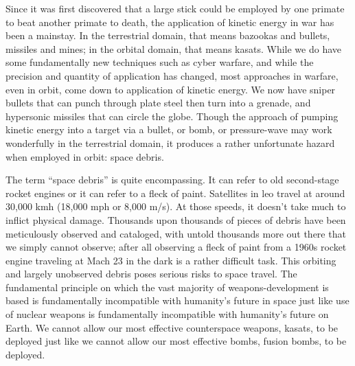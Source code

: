 {}

\titlenote{}

\maketitle

\pagestyle{theRest}
\thispagestyle{firstPage}

Since it was first discovered that a large stick could be employed by
one primate to beat another primate to death, the application of
kinetic energy in war has been a mainstay.  In the terrestrial domain,
that means bazookas and bullets, missiles and mines; in the orbital
domain, that means \acp{kasat}.  While we do have some fundamentally
new techniques such as cyber warfare\cite{big-risks}, and while the
precision and quantity of application has changed, most approaches in
warfare, even in orbit, come down to application of kinetic
energy.\cite{brian} We now have sniper bullets that can punch through
plate steel then turn into a grenade\cite{fancy-bullets}, and
hypersonic missiles that can circle the globe.\cite{china-is-hyper}
Though the approach of pumping kinetic energy into a target via a
bullet, or bomb, or pressure-wave may work wonderfully in the
terrestrial domain, it produces a rather unfortunate hazard when
employed in orbit: space debris.

The term ``space debris'' is quite encompassing.  It can refer to old
second-stage rocket engines or it can refer to a fleck of
paint\cite{paint-is-power}.  Satellites in \ac{leo} travel at around
30,000 kmh (18,000 mph or 8,000 m/s). At those speeds, it doesn't take
much to inflict physical damage.  Thousands upon thousands of pieces
of debris have been meticulously observed and
cataloged\cite{debris-101}, with untold thousands more out there that
we simply cannot observe; after all observing a fleck of paint from a
1960s rocket engine traveling at Mach 23 in the dark is a rather
difficult task.  This orbiting and largely unobserved debris poses
serious risks to space travel.  The fundamental principle on which the
vast majority of weapons-development is based is fundamentally
incompatible with humanity's future in space just like use of nuclear
weapons is fundamentally incompatible with humanity's future on Earth.
We cannot allow our most effective counterspace weapons, \acp{kasat},
to be deployed just like we cannot allow our most effective bombs,
fusion bombs, to be deployed.

